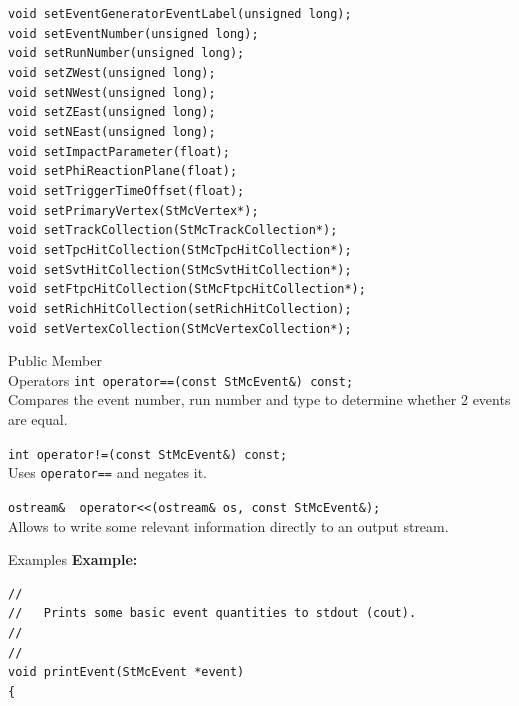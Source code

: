\begin{Entry}
    \verb+void setEventGeneratorEventLabel(unsigned long);+\\
    \verb+void setEventNumber(unsigned long);+\\
    \verb+void setRunNumber(unsigned long);+\\
    \verb+void setZWest(unsigned long);+\\
    \verb+void setNWest(unsigned long);+\\
    \verb+void setZEast(unsigned long);+\\
    \verb+void setNEast(unsigned long);+\\
    \verb+void setImpactParameter(float);+\\
    \verb+void setPhiReactionPlane(float);+\\
    \verb+void setTriggerTimeOffset(float);+\\
    \verb+void setPrimaryVertex(StMcVertex*);+\\
    \verb+void setTrackCollection(StMcTrackCollection*);+\\
    \verb+void setTpcHitCollection(StMcTpcHitCollection*);+\\
    \verb+void setSvtHitCollection(StMcSvtHitCollection*);+\\
    \verb+void setFtpcHitCollection(StMcFtpcHitCollection*);+\\
    \verb+void setRichHitCollection(setRichHitCollection);+\\
    \verb+void setVertexCollection(StMcVertexCollection*);+\\

\item[Public Member\\ Operators]
    \verb+int operator==(const StMcEvent&) const;+\\
    Compares the event number, run number and type to determine
    whether 2 events are equal.

    \verb+int operator!=(const StMcEvent&) const;+\\
    Uses {\tt operator==} and negates it.

    \verb+ostream&  operator<<(ostream& os, const StMcEvent&);+\\
    Allows to write some relevant information directly to an output
    stream.

\item[Examples]
{\bf Example:}
{\footnotesize
\begin{verbatim}
//
//   Prints some basic event quantities to stdout (cout).
//   
//
void printEvent(StMcEvent *event)
{
     

\end{verbatim}}
\end{Entry}
